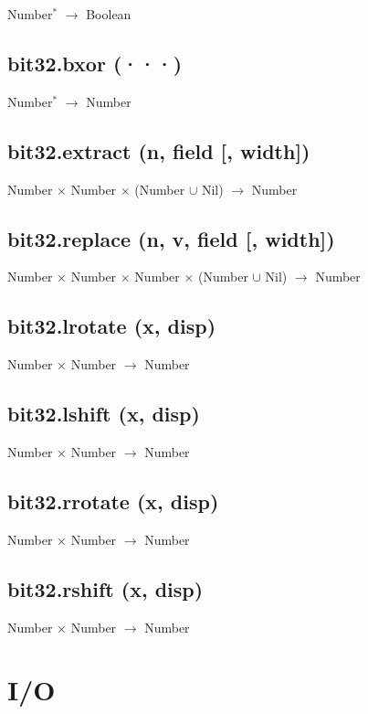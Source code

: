 \documentclass[12pt]{article}
\begin{document}
Number$^*$ $\rightarrow$ Boolean

\subsection{bit32.bxor (···)}

Number$^*$ $\rightarrow$ Number

\subsection{bit32.extract (n, field [, width])}

Number $\times$ Number $\times$
(Number $\cup$ Nil) $\rightarrow$
Number

\subsection{bit32.replace (n, v, field [, width])}

Number $\times$ Number $\times$ Number $\times$
(Number $\cup$ Nil) $\rightarrow$
Number

\subsection{bit32.lrotate (x, disp)}

Number $\times$ Number $\rightarrow$ Number

\subsection{bit32.lshift (x, disp)}

Number $\times$ Number $\rightarrow$ Number

\subsection{bit32.rrotate (x, disp)}

Number $\times$ Number $\rightarrow$ Number

\subsection{bit32.rshift (x, disp)}

Number $\times$ Number $\rightarrow$ Number

\newpage

\section{I/O}
\end{document}
